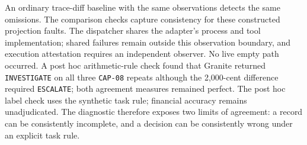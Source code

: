 An ordinary trace-diff baseline with the same observations detects the same
omissions. The comparison checks capture consistency for these constructed
projection faults. The dispatcher shares the adapter's process and tool
implementation; shared failures remain outside this observation boundary,
and execution attestation requires an independent observer.
No live empty path occurred.
A post hoc arithmetic-rule check found that Granite returned
\texttt{INVESTIGATE} on all three \texttt{CAP-08} repeats although the
2,000-cent difference required \texttt{ESCALATE}; both agreement measures
remained perfect. The post hoc label check uses the synthetic task rule;
financial accuracy remains unadjudicated. The diagnostic therefore exposes two
limits of agreement: a record can be consistently incomplete, and a decision
can be consistently wrong under an explicit task rule.
